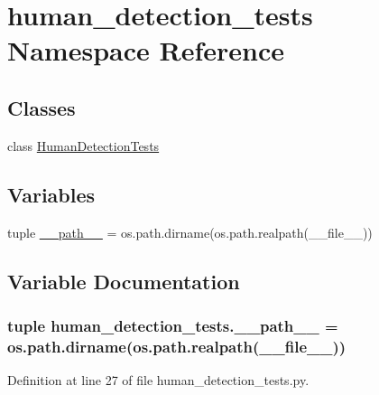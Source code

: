 \hypertarget{namespacehuman__detection__tests}{\section{human\-\_\-detection\-\_\-tests Namespace Reference}
\label{namespacehuman__detection__tests}
}
\subsection*{Classes}
\begin{DoxyCompactItemize}
\item 
class \hyperlink{classhuman__detection__tests_1_1HumanDetectionTests}{Human\-Detection\-Tests}
\end{DoxyCompactItemize}
\subsection*{Variables}
\begin{DoxyCompactItemize}
\item 
tuple \hyperlink{namespacehuman__detection__tests_ac5653a9023fd0ea3fc707628cc6940a6}{\-\_\-\-\_\-path\-\_\-\-\_\-} = os.\-path.\-dirname(os.\-path.\-realpath(\-\_\-\-\_\-file\-\_\-\-\_\-))
\end{DoxyCompactItemize}


\subsection{Variable Documentation}
\hypertarget{namespacehuman__detection__tests_ac5653a9023fd0ea3fc707628cc6940a6}{
\subsubsection[{\-\_\-\-\_\-path\-\_\-\-\_\-}]{\setlength{\rightskip}{0pt plus 5cm}tuple human\-\_\-detection\-\_\-tests.\-\_\-\-\_\-path\-\_\-\-\_\- = os.\-path.\-dirname(os.\-path.\-realpath(\-\_\-\-\_\-file\-\_\-\-\_\-))}}\label{namespacehuman__detection__tests_ac5653a9023fd0ea3fc707628cc6940a6}


Definition at line 27 of file human\-\_\-detection\-\_\-tests.\-py.


